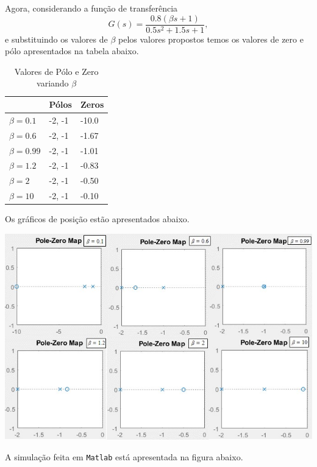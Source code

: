 \documentclass[
]{book}
\begin{document}
Agora, considerando a função de transferência
\[
G(s) = \frac {0.8(\beta s+1)}{0.5s^2+1.5s+1},
\]
e substituindo os valores de \(\beta\) pelos valores propostos temos os valores de zero e pólo apresentados na tabela abaixo.

\begin{table}

\caption{\label{tab:unnamed-chunk-6}Valores de Pólo e Zero variando $\beta$}
\centering
\begin{tabular}[t]{lll}
\toprule
  & Pólos & Zeros\\
\midrule
$\beta = 0.1$ & {-2, -1} & -10.0\\
$\beta = 0.6$ & {-2, -1} & -1.67\\
$\beta = 0.99$ & {-2, -1} & -1.01\\
$\beta = 1.2$ & {-2, -1} & -0.83\\
$\beta = 2$ & {-2, -1} & -0.50\\
\addlinespace
$\beta = 10$ & {-2, -1} & -0.10\\
\bottomrule
\end{tabular}
\end{table}

Os gráficos de posição estão apresentados abaixo.

\includegraphics{Imagens/Lab2/prob4Varios.jpg}

A simulação feita em \texttt{Matlab} está apresentada na figura abaixo.
\end{document}
